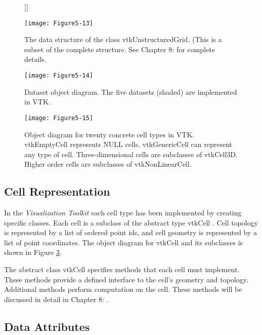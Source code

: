 \begin{figure}[!htb]
	[\FBwidth]
	{\caption{The data structure of the class vtkUnstructuredGrid. (This is a subset of the complete structure. See Chapter 8:  for complete details.}\label{fig:Figure5-13}}
	{\texttt{[image: Figure5-13]}}
\end{figure}



\begin{figure}[!htb]
	\centering
	\texttt{[image: Figure5-14]}
	\caption{Dataset object diagram. The five datasets (shaded) are implemented in VTK.}
	\label{fig:Figure5-14}
\end{figure}

\begin{figure}[!htb]
	\centering
	\texttt{[image: Figure5-15]}
	\caption{Object diagram for twenty concrete cell types in VTK. vtkEmptyCell represents NULL cells. vtkGenericCell can represent any type of cell. Three-dimensional cells are subclasses of vtkCell3D. Higher order cells are subclasses of vtkNonLinearCell.}
	\label{fig:Figure5-15}
\end{figure}

\subsection{Cell Representation}

In the \emph{Visualization Toolkit} each cell type has been implemented by creating specific classes. Each cell is a subclass of the abstract type vtkCell . Cell topology is represented by a list of ordered point ids, and cell geometry is represented by a list of point coordinates. The object diagram for vtkCell and its subclasses is shown in Figure \ref{fig:Figure5-15}.

The abstract class vtkCell specifies methods that each cell must implement. These methods provide a defined interface to the cell’s geometry and topology. Additional methods perform computation on the cell. These methods will be discussed in detail in Chapter 8: .

\subsection{Data Attributes}

